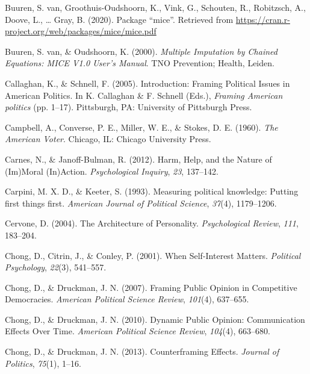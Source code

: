 \documentclass[12pt,econ]{sources/authesis}
\begin{document}
\leavevmode\hypertarget{ref-buuren_2020_package}{}%
Buuren, S. van, Groothuis-Oudshoorn, K., Vink, G., Schouten, R., Robitzsch, A., Doove, L., \ldots{} Gray, B. (2020). Package ``mice''. Retrieved from \url{https://cran.r-project.org/web/packages/mice/mice.pdf}

\leavevmode\hypertarget{ref-buuren_2000_multiple}{}%
Buuren, S. van, \& Oudshoorn, K. (2000). \emph{Multiple Imputation by Chained Equations: MICE V1.0 User's Manual}. TNO Prevention; Health, Leiden.

\leavevmode\hypertarget{ref-callaghan_introduction_2005}{}%
Callaghan, K., \& Schnell, F. (2005). Introduction: Framing Political Issues in American Politics. In K. Callaghan \& F. Schnell (Eds.), \emph{Framing American politics} (pp. 1--17). Pittsburgh, PA: University of Pittsburgh Press.

\leavevmode\hypertarget{ref-campbell_american_1960}{}%
Campbell, A., Converse, P. E., Miller, W. E., \& Stokes, D. E. (1960). \emph{The American Voter}. Chicago, IL: Chicago University Press.

\leavevmode\hypertarget{ref-carnes_2012_harm}{}%
Carnes, N., \& Janoff-Bulman, R. (2012). Harm, Help, and the Nature of (Im)Moral (In)Action. \emph{Psychological Inquiry}, \emph{23}, 137--142.

\leavevmode\hypertarget{ref-carpini_1993_measuring}{}%
Carpini, M. X. D., \& Keeter, S. (1993). Measuring political knowledge: Putting first things first. \emph{American Journal of Political Science}, \emph{37}(4), 1179--1206.

\leavevmode\hypertarget{ref-cervone_2004_architecture}{}%
Cervone, D. (2004). The Architecture of Personality. \emph{Psychological Review}, \emph{111}, 183--204.

\leavevmode\hypertarget{ref-chong_when_2001}{}%
Chong, D., Citrin, J., \& Conley, P. (2001). When Self-Interest Matters. \emph{Political Psychology}, \emph{22}(3), 541--557.

\leavevmode\hypertarget{ref-chong_framing_2007}{}%
Chong, D., \& Druckman, J. N. (2007). Framing Public Opinion in Competitive Democracies. \emph{American Political Science Review}, \emph{101}(4), 637--655.

\leavevmode\hypertarget{ref-chong_dynamic_2010}{}%
Chong, D., \& Druckman, J. N. (2010). Dynamic Public Opinion: Communication Effects Over Time. \emph{American Political Science Review}, \emph{104}(4), 663--680.

\leavevmode\hypertarget{ref-chong_counterframing_2013}{}%
Chong, D., \& Druckman, J. N. (2013). Counterframing Effects. \emph{Journal of Politics}, \emph{75}(1), 1--16.
\end{document}

